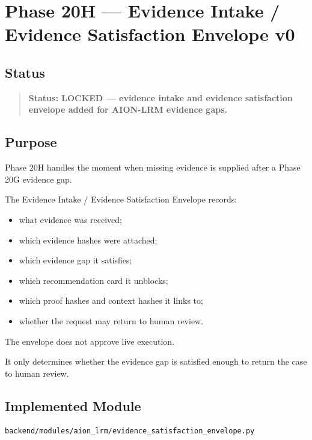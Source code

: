 \section{Phase 20H --- Evidence Intake / Evidence Satisfaction Envelope v0}
\label{sec:phase20h-evidence-satisfaction-envelope-v0}

\subsection{Status}

\begin{quote}
\textbf{Status: LOCKED --- evidence intake and evidence satisfaction envelope added for AION-LRM evidence gaps.}
\end{quote}

\subsection{Purpose}

Phase 20H handles the moment when missing evidence is supplied after a Phase 20G evidence gap.

The Evidence Intake / Evidence Satisfaction Envelope records:

\begin{itemize}
  \item what evidence was received;
  \item which evidence hashes were attached;
  \item which evidence gap it satisfies;
  \item which recommendation card it unblocks;
  \item which proof hashes and context hashes it links to;
  \item whether the request may return to human review.
\end{itemize}

The envelope does not approve live execution.

It only determines whether the evidence gap is satisfied enough to return the case to human review.

\subsection{Implemented Module}

\begin{verbatim}
backend/modules/aion_lrm/evidence_satisfaction_envelope.py
\end{verbatim}

